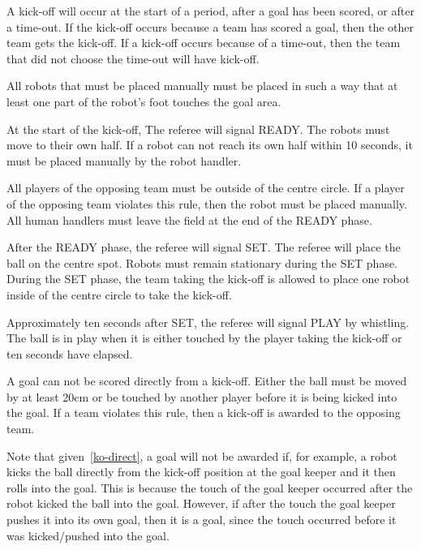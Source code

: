 \documentclass[12pt]{hurocup}
\begin{document}
\begin{lawlist}[US]

\item A kick-off will occur at the start of a period, after a goal has
  been scored, or after a time-out. If the kick-off occurs because a
  team has scored a goal, then the other team gets the kick-off. If a
  kick-off occurs because of a time-out, then the team that did not
  choose the time-out will have kick-off.

\item All robots that must be placed manually must be placed in such a
  way that at least one part of the robot's foot touches the goal
  area.

\item At the start of the kick-off, The referee will signal READY. The
  robots must move to their own half. If a robot can not reach its own
  half within 10 seconds, it must be placed manually by the robot
  handler.
  
\item All players of the opposing team must be outside of the centre
  circle. If a player of the opposing team violates this rule, then
  the robot must be placed manually. All human handlers must leave the
  field at the end of the READY phase.

\item After the READY phase, the referee will signal SET. The referee
  will place the ball on the centre spot. Robots must remain
  stationary during the SET phase. During the SET phase, the team
  taking the kick-off is allowed to place one robot inside of the
  centre circle to take the kick-off. 

\item Approximately ten seconds after SET, the referee will signal
  PLAY by whistling. The ball is in play when it is either touched by
  the player taking the kick-off or ten seconds have elapsed.

\item \label{ko-direct} A goal can not be scored directly from a
  kick-off. Either the ball must be moved by at least 20cm or be
  touched by another player before it is being kicked into the goal.
  If a team violates this rule, then a kick-off is awarded to the
  opposing team.

\end{lawlist}

\begin{decisions}
\item Note that given~\ref{ko-direct}, a goal will not be awarded if,
  for example, a robot kicks the ball directly from the kick-off
  position at the goal keeper and it then rolls into the goal. This is
  because the touch of the goal keeper occurred after the robot kicked
  the ball into the goal. However, if after the touch the goal keeper
  pushes it into its own goal, then it is a goal, since the touch
  occurred before it was kicked/pushed into the goal.
\end{decisions}
\end{document}
